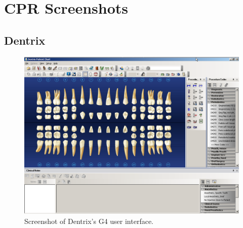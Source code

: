 \documentclass[11pt]{article}
\begin{document}
\footnotesize{
}
\newpage

\appendix

\section{CPR Screenshots}
\label{SS}
\subsection{Dentrix}
\label{dentrixplain}

\begin{figure}[h]
\begin{center}
\includegraphics[width=\textwidth]{dentrixss1.png}
\end{center}
\caption{Screenshot of Dentrix's G4 user interface.}
\end{figure}

\newpage
\end{document}
